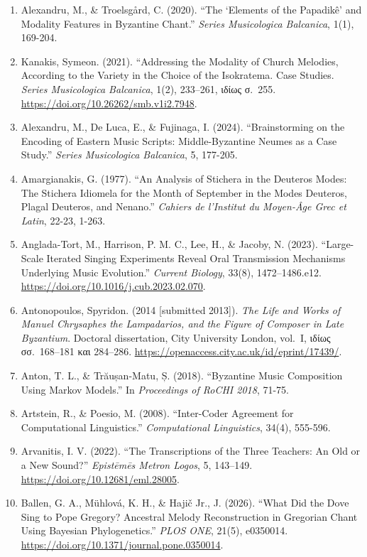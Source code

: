 \documentclass[11pt,a4paper]{article}
\providecommand{\tightlist}{\setlength{\itemsep}{0pt}\setlength{\parskip}{0pt}}
\begin{document}
\begin{enumerate}
\def\labelenumi{\arabic{enumi}.}

\tightlist

\item
 Alexandru, M., \& Troelsgård, C. (2020). ``The `Elements of the Papadikê' and Modality Features in Byzantine Chant.'' \emph{Series Musicologica Balcanica}, 1(1), 169-204.
\item
 Kanakis, Symeon. (2021). ``Addressing the Modality of Church Melodies, According to the Variety in the Choice of the Isokratema. Case Studies. \emph{Series Musicologica Balcanica}, 1(2), 233--261, ιδίως σ.~255. \url{https://doi.org/10.26262/smb.v1i2.7948}.
\item
 Alexandru, M., De Luca, E., \& Fujinaga, I. (2024). ``Brainstorming on the Encoding of Eastern Music Scripts: Middle-Byzantine Neumes as a Case Study.'' \emph{Series Musicologica Balcanica}, 5, 177-205.
\item
 Amargianakis, G. (1977). ``An Analysis of Stichera in the Deuteros Modes: The Stichera Idiomela for the Month of September in the Modes Deuteros, Plagal Deuteros, and Nenano.'' \emph{Cahiers de l'Institut du Moyen-Âge Grec et Latin}, 22-23, 1-263.
\item
 Anglada-Tort, M., Harrison, P. M. C., Lee, H., \& Jacoby, N. (2023). ``Large-Scale Iterated Singing Experiments Reveal Oral Transmission Mechanisms Underlying Music Evolution.'' \emph{Current Biology}, 33(8), 1472--1486.e12. \url{https://doi.org/10.1016/j.cub.2023.02.070}.
\item
 Antonopoulos, Spyridon. (2014 [submitted 2013]). \emph{The Life and Works of Manuel Chrysaphes the Lampadarios, and the Figure of Composer in Late Byzantium}. Doctoral dissertation, City University London, vol.~I, ιδίως σσ.~168--181 και 284--286. \url{https://openaccess.city.ac.uk/id/eprint/17439/}.
\item
 Anton, T. L., \& Trăușan-Matu, Ș. (2018). ``Byzantine Music Composition Using Markov Models.'' In \emph{Proceedings of RoCHI 2018}, 71-75.
\item
 Artstein, R., \& Poesio, M. (2008). ``Inter-Coder Agreement for Computational Linguistics.'' \emph{Computational Linguistics}, 34(4), 555-596.
\item
 Arvanitis, I. V. (2022). ``The Transcriptions of the Three Teachers: An Old or a New Sound?'' \emph{Epistēmēs Metron Logos}, 5, 143--149. \url{https://doi.org/10.12681/eml.28005}.
\item
 Ballen, G. A., Mühlová, K. H., \& Hajič Jr., J. (2026). ``What Did the Dove Sing to Pope Gregory? Ancestral Melody Reconstruction in Gregorian Chant Using Bayesian Phylogenetics.'' \emph{PLOS ONE}, 21(5), e0350014. \url{https://doi.org/10.1371/journal.pone.0350014}.

\end{enumerate}
\end{document}
